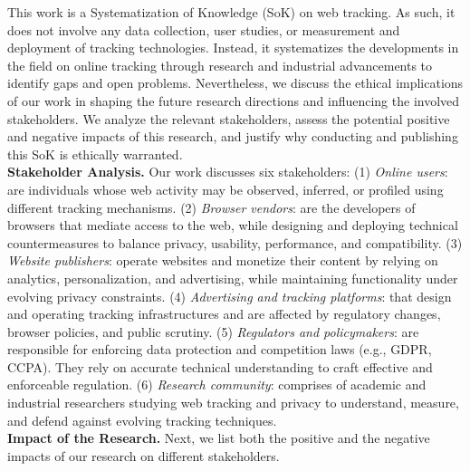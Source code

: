 
This work is a Systematization of Knowledge (SoK) on web tracking. 
%
As such, it does not involve any data collection, user studies, or measurement  and deployment of tracking technologies.
%
Instead, it systematizes the developments in the field on online tracking through research and industrial advancements to identify gaps and open problems.
%
Nevertheless, we discuss the ethical implications of our work in shaping the future research directions and influencing the involved stakeholders.
%
We analyze the relevant stakeholders, assess the potential positive and negative impacts of this research, and justify why conducting and publishing this SoK is ethically warranted.\\

\noindent \textbf{Stakeholder Analysis.} 
%
Our work discusses six stakeholders: 
%
(1) \textit{Online users}: 
%
are individuals whose web activity may be observed, inferred, or profiled using different tracking mechanisms. 
%
(2) \textit{Browser vendors}: 
%
are the developers of browsers that mediate access to the web, while designing and deploying technical countermeasures to balance privacy, usability, performance, and compatibility.
%
(3) \textit{Website publishers}: 
%
operate websites and monetize their content by relying on analytics, personalization, and advertising, while maintaining functionality under evolving privacy constraints.
%
(4) \textit{Advertising and tracking platforms}: 
%
that design and operating tracking infrastructures and are affected by regulatory changes, browser policies, and public scrutiny.
%
(5) \textit{Regulators and policymakers}: 
%
are responsible for enforcing data protection and competition laws (e.g., GDPR, CCPA). They rely on accurate technical understanding to craft effective and enforceable regulation.
%
(6) \textit{Research community}: 
%
comprises of academic and industrial researchers studying web tracking and privacy to understand, measure, and defend against evolving tracking techniques.\\

\noindent \textbf{Impact of the Research.} 
%
Next, we list both the positive and the negative impacts of our research on different stakeholders.

